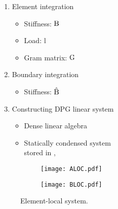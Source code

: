 \begin{minipage}{0.48\textwidth}
\begin{enumerate}
	\itemsep -10pt
	\item Element integration \vspace{-15pt}
	\begin{itemize}
		\itemsep -8pt
		\item Stiffness: $\mathrm{B}$
		\item Load: $\mathrm{l}$
		\item Gram matrix: $\mathrm{G}$
	\end{itemize}
	\item Boundary integration \vspace{-15pt}
	\begin{itemize}
		\itemsep -8pt
		\item Stiffness: $\mathrm{\hat B}$
	\end{itemize}
	\item Constructing DPG linear system \vspace{-15pt}
	\begin{itemize}
		\itemsep -8pt
		\item Dense linear algebra
		\item {Statically condensed system\\[-5pt] 
		stored in , }
	\end{itemize}
\end{enumerate}
\end{minipage}%
\begin{minipage}{0.48\textwidth}
\begin{figure}[H]
	\centering
	\begin{subfigure}[b]{0.6\textwidth}
		\texttt{[image: ALOC.pdf]}
	\end{subfigure}
	\begin{subfigure}[b]{0.3\textwidth}
		\texttt{[image: BLOC.pdf]}
	\end{subfigure}
	\caption*{Element-local system.}
\end{figure}
\end{minipage}

